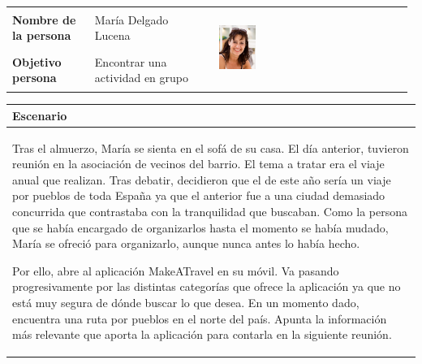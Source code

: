 \documentclass[11pt]{article}
\begin{document}
\begin{table}[H]
  \centering
  \begin{tabular}{p{0.2\linewidth}|p{0.3\linewidth}p{0.475\linewidth}}
    \toprule
    \textbf{Nombre de la persona} & María Delgado Lucena &\multirow{2}{*}{\begin{minipage}{1.\textwidth}\includegraphics[width=0.2\textwidth, height=25mm]{Maria}\end{minipage}}\\
    \textbf{Objetivo persona} & Encontrar una actividad en grupo & \\
    \bottomrule
  \end{tabular}

\begin{tabular}{p{1.028\linewidth}}
  \textbf{Escenario}\\
  \midrule
	Tras el almuerzo, María se sienta en el sofá de su casa. El día anterior, tuvieron reunión en la asociación de vecinos del barrio. El tema a tratar era el viaje anual que realizan. Tras debatir, decidieron que el de este año sería un viaje por pueblos de toda España ya que el anterior fue a una ciudad demasiado concurrida que contrastaba con la tranquilidad que buscaban. Como la persona que se había encargado de organizarlos hasta el momento se había mudado, María se ofreció para organizarlo, aunque nunca antes lo había hecho.
	
	Por ello, abre al aplicación MakeATravel en su móvil. Va pasando progresivamente por las distintas categorías que ofrece la aplicación ya que no está muy segura de dónde buscar lo que desea. En un momento dado, encuentra una ruta por pueblos en el norte del país. Apunta la información más relevante que aporta la aplicación para contarla en la siguiente reunión. 
\end{tabular}
\end{table}
\end{document}
